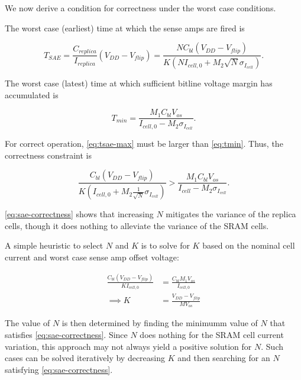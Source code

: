 We now derive a condition for correctness under the worst case conditions.

The worst case (earliest) time at which the sense amps are fired is

\begin{equation} \label{eq:tsae-max}
T_{SAE} = \frac{C_{replica}}{I_{replica}} \left( V_{DD} - V_{flip} \right)
= \frac{ N C_{bl}  \left(V_{DD} - V_{flip} \right) }{ K \left( N I_{cell,0} + M_2 \sqrt{N} \sigma_{I_{cell}} \right)}.
\end{equation}

The worst case (latest) time at which sufficient bitline voltage margin has accumulated is

\begin{equation} \label{eq:tmin}
T_{min} = \frac{M_1 C_{bl} V_{os}}{I_{cell,0} - M_2 \sigma_{I_{cell}}}.
\end{equation}

For correct operation, \ref{eq:tsae-max} must be larger than \ref{eq:tmin}. Thus, the correctness constraint is

\begin{equation} \label{eq:sae-correctness}
\frac{C_{bl}  \left( V_{DD} - V_{flip}\right)}{K \left( I_{cell,0} + M_2 \frac{1}{\sqrt{N}} \sigma_{I_{cell}} \right)} >
\frac{M_1 C_{bl} V_{os}}{I_{cell} - M_2 \sigma_{I_{cell}}}.
\end{equation}

\ref{eq:sae-correctness} shows that increasing $N$ mitigates the variance of the replica cells,
though it does nothing to alleviate the variance of the SRAM cells.

A simple heuristic to select $N$ and $K$ is to solve for $K$ based on the nominal cell current and worst case
sense amp offset voltage:

\begin{align} \label{eq:k-heuristic}
\frac{C_{bl} \left( V_{DD} - V_{flip} \right) }{K I_{cell,0}}
&= \frac{C_{bl} M_1 V_{os}}{I_{cell,0}} \\
\implies K &= \frac{V_{DD} - V_{flip}}{M V_{os}}
\end{align}

The value of $N$ is then determined by finding the minimumm value of $N$ that satisfies \ref{eq:sae-correctness}.
Since $N$ does nothing for the SRAM cell current variation, this approach may not always yield a positive solution for $N$.
Such cases can be solved iteratively by decreasing $K$ and then searching for an $N$ satisfying \ref{eq:sae-correctness}.

